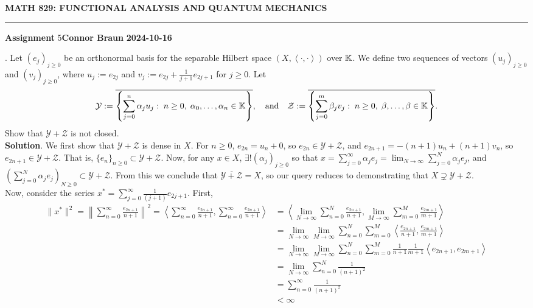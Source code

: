 \documentclass[10pt]{article}
\newcommand{\1}[1]{\mathbbm{1}_{#1}} \newcommand{\mc}[1]{\mathcal{#1}}
\newcommand{\ip}[2]{\left\langle#1,#2\right\rangle }
\begin{document}
    \begin{center}
        {\bf\large{MATH 829: FUNCTIONAL ANALYSIS AND QUANTUM MECHANICS}}
        \smallskip
        \hrule
        \smallskip
        {\bf Assignment} 5\hfill {\bf Connor Braun} \hfill {\bf 2024-10-16}
    \end{center}
    \vspace{5pt}
    . Let $(e_j)_{j\geq 0}$ be an orthonormal basis for the separable Hilbert space $(X,\ip{\cdot}{\cdot})$ over $\mathbb{K}$. We define two
    sequences of vectors $(u_j)_{j\geq 0}$ and $(v_j)_{j\geq 0}$, where $u_j:=e_{2j}$ and $v_j:=e_{2j}+\frac{1}{j+1}e_{2j+1}$ for $j\geq 0$. Let
    \begin{align*}
        \mc{Y}:=\overline{\left\{\sum_{j=0}^n\alpha_ju_j:\;n\geq 0,\;\alpha_0,\dots,\alpha_n\in\mbb{K}\right\}},\quad\text{and}\quad \mc{Z}:=\overline{\left\{\sum_{j=0}^m\beta_jv_j:\;n\geq 0,\;\beta,\dots,\beta\in\mbb{K}\right\}}.
    \end{align*}
    Show that $\mc{Y}+\mc{Z}$ is not closed.\\[5pt]
    {\bf Solution}. We first show that $\mc{Y}+\mc{Z}$ is dense in $X$. For $n\geq 0$, $e_{2n}=u_n+0$, so $e_{2n}\in\mc{Y}+\mc{Z}$, and $e_{2n+1}=-(n+1)u_n+(n+1)v_n$, so $e_{2n+1}\in\mc{Y}+\mc{Z}$. That is, $\{e_n\}_{n\geq 0}\subset \mc{Y}+\mc{Z}$.
    Now, for any $x\in X$, $\exists!(\alpha_j)_{j\geq 0}$ so that $x=\sum_{j=0}^\infty\alpha_je_j=\lim_{N\rightarrow\infty}\sum_{j=0}^N\alpha_je_j$, and $(\sum_{j=0}^N\alpha_je_j)_{N\geq 0}\subset \mc{Y}+\mc{Z}$. From this we conclude that $\overline{\mc{Y}+\mc{Z}}=X$, so our query reduces to
    demonstrating that $X\supsetneq\mc{Y}+\mc{Z}$.\\[5pt]
    Now, consider the series $x^\ast=\sum_{j=0}^\infty\frac{1}{(j+1)}e_{2j+1}$. First,
    \begin{align*}
        \|x^\ast\|^2=\left\|\sum_{n=0}^\infty\frac{e_{2n+1}}{n+1}\right\|^2=\ip{\sum_{n=0}^\infty\frac{e_{2n+1}}{n+1}}{\sum_{n=0}^\infty\frac{e_{2n+1}}{n+1}}&=\ip{\lim_{N\rightarrow\infty}\sum_{n=0}^N\frac{e_{2n+1}}{n+1}}{\lim_{M\rightarrow\infty}\sum_{m=0}^M\frac{e_{2m+1}}{m+1}}\\
        &=\lim_{N\rightarrow\infty}\lim_{M\rightarrow\infty}\sum_{n=0}^N\sum_{m=0}^M\ip{\frac{e_{2n+1}}{n+1}}{\frac{e_{2m+1}}{m+1}}\\
        &=\lim_{N\rightarrow\infty}\lim_{M\rightarrow\infty}\sum_{n=0}^N\sum_{m=0}^M\frac{1}{n+1}\frac{1}{m+1}\ip{e_{2n+1}}{e_{2m+1}}\\
        &=\lim_{N\rightarrow\infty}\sum_{n=0}^N\frac{1}{(n+1)^2}\\
        &=\sum_{n=0}^\infty\frac{1}{(n+1)^2}\tag{1}\\
        &<\infty
    \end{align*}
\end{document}
